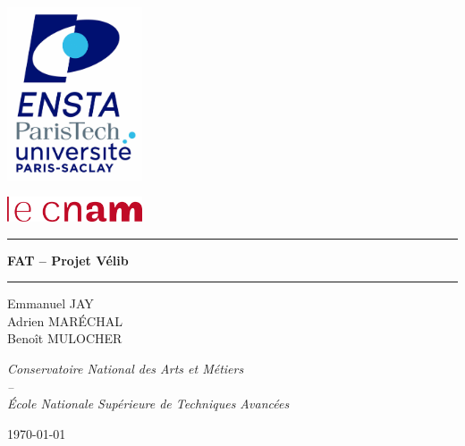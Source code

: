 \documentclass[12pt,a4paper]{article}
\begin{document}
\setcounter{page}{0}


\begin{center}

\begin{minipage}[l]{.49\linewidth}
	\flushleft\includegraphics[width=4cm]{img/logo_ENSTA.jpg}
\end{minipage}
\begin{minipage}[r]{.49\linewidth}
	\flushright\includegraphics[width=4cm]{img/logo_CNAM.png}
\end{minipage}
\vspace{1.5cm}

\hrule \vspace{0.5cm}
\begin{LARGE}
	\textbf{FAT -- Projet Vélib}\\
\end{LARGE}
\vspace{0.5cm} \hrule
\vspace{3cm}

\begin{Large}\color{carmine}
	Emmanuel JAY\\
	Adrien MAR\'ECHAL\\
	Benoît MULOCHER\\
\end{Large}
\vspace{5cm}

\begin{large}
	\textit{Conservatoire National des Arts et Métiers\\
	--\\
	\'Ecole Nationale Supérieure de Techniques Avancées\\}
\end{large}
\vfill

\today
\end{center}
\end{document}
